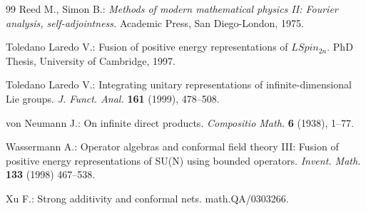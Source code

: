 \documentclass[12pt]{article}
\begin{document}
\begin{thebibliography}{99}
 Reed M., Simon B.: {\it Methods of modern mathematical
physics II: Fourier analysis, self-adjointness.} Academic Press,
San Diego-London, 1975.

 Toledano Laredo V.: Fusion of positive energy 
representations of $LSpin_{2n}$. PhD Thesis, University of 
Cambridge, 1997. 

 Toledano Laredo V.:  Integrating unitary representations
of infinite-dimensional Lie groups. 
{\it J. Funct. Anal.} {\bf 161} (1999), 478--508.

 von Neumann J.: On infinite direct products. 
{\it Compositio Math.} {\bf 6} (1938), 1--77.

 Wassermann A.: Operator algebras and conformal field
theory III: Fusion of positive energy representations of SU(N) using
bounded operators. {\it Invent. Math.} {\bf133} (1998) 467--538.

 Xu F.: Strong additivity and conformal nets.
math.QA/0303266.



\end{thebibliography}
\end{document}
